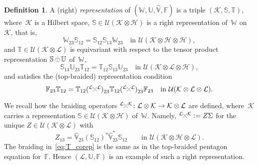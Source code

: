 \documentclass[a4paper]{amsart}
\numberwithin{equation}{section}
\theoremstyle{plain}
\numberwithin{theorem}{section}
\theoremstyle{definition}
\newtheorem{definition}[theorem]{Definition}
\theoremstyle{remark}
\newcommand{\tenscorep}{\mathbin{\begin{tikzpicture}[baseline,x=.75ex,y=.75ex] \draw[line width=.2pt] (-0.8,1.15)--(0.8,1.15);\draw[line width=.2pt](0,-0.25)--(0,1.15); \draw[line width=.2pt] (0,0.75) circle [radius = 1];\end{tikzpicture}}}
\newcommand*{\Braiding}[2]{\begin{tikzpicture}[baseline]
    \draw[-] (0,0) -- (1.4ex,1.4ex) node[right,inner sep=0pt] {$\scriptstyle #2$};
    \draw[-,draw=white,line width=2.4pt] (0,1.4ex) -- (1.4ex,0);
    \draw[-] (1.4ex,0) -- (0,1.4ex) node[left,inner sep=0pt] {$\scriptstyle #1$};
  \end{tikzpicture}}
\newcommand*{\Dualbraiding}[2]{\begin{tikzpicture}[baseline]
    \draw[-] (1.4ex,0) -- (0,1.4ex) node[left,inner sep=0pt] {$\scriptstyle #1$};
    \draw[-,draw=white,line width=2.4pt] (0,0) -- (1.4ex,1.4ex);
    \draw[-] (0,0) -- (1.4ex,1.4ex) node[right,inner sep=0pt] {$\scriptstyle #2$};
  \end{tikzpicture}}
\newcommand*{\Corep}[1]{\mathbb{#1}}          %
\newcommand*{\DuCorep}[1]{\hat{\Corep{#1}}}   %
\newcommand*{\Multunit}[1][]{\mathbb W^{#1}}%
\newcommand*{\BrMultunit}{\mathbb F}%
\newcommand*{\Flip}{\Sigma}%
\newcommand*{\Hils}[1][H]{\mathcal{#1}}%
\newcommand*{\U}{\mathcal U}%
\newcommand*{\defeq}{\mathrel{\vcentcolon=}}
\begin{document}
\begin{definition}
  \label{def:braided_corep}
  A (right) \emph{representation} of
  \((\Multunit,\Corep{U},\DuCorep{V},\BrMultunit)\)
  is a triple \((\Hils[K],\Corep{S},\Corep{T})\),
  where~\(\Hils[K]\)
  is a Hilbert space, \(\Corep{S}\in \U(\Hils[K]\otimes\Hils)\)
  is a right representation of~\(\Multunit\)
  on~\(\Hils[K]\), that is,
  \begin{equation}
    \label{eq:S_corep}
    \Multunit_{23} \Corep{S}_{12}
    = \Corep{S}_{12} \Corep{S}_{13} \Multunit_{23}
    \quad\text{in }\U(\Hils[K]\otimes\Hils\otimes\Hils),
  \end{equation}
  and \(\Corep{T}\in\U(\Hils[K]\otimes\Hils[L])\)
  is equivariant with respect to the tensor product representation
  \(\Corep{S}\tenscorep\Corep{U}\) of~\(\Multunit\),
  \begin{equation}
    \label{eq:T_SU-invariant}
    \Corep{S}_{13} \Corep{U}_{23} \Corep{T}_{12}
    = \Corep{T}_{12} \Corep{S}_{13} \Corep{U}_{23}
    \quad\text{in }\U(\Hils[K]\otimes\Hils[L]\otimes \Hils),
  \end{equation}
  and satisfies the (top-braided) representation condition
  \begin{equation}
    \label{eq:T_corep}
    \BrMultunit_{23} \Corep{T}_{12}
    = \Corep{T}_{12} (\Braiding{\Hils[L]}{\Hils[L]})^{\phantom1}_{23}
    \Corep{T}_{12} (\Dualbraiding{\Hils[L]}{\Hils[L]})^{\phantom1}_{23}
    \BrMultunit_{23}
    \quad\text{in }\U(\Hils[K]\otimes\Hils[L]\otimes\Hils[L]).
  \end{equation}
\end{definition}

We recall how the braiding operators
\(\Braiding{\Hils[L]}{\Hils[K]}\colon \Hils[L]\otimes\Hils[K]
\to\Hils[K]\otimes\Hils[L]\)
are defined, where~\(\Hils[K]\)
carries a representation \(\Corep{S}\in \U(\Hils[K]\otimes\Hils)\)
of~\(\Multunit\).
Namely, \(\Braiding{\Hils[L]}{\Hils[K]} \defeq Z\Flip\)
for the unique \(Z\in\U(\Hils[K]\otimes\Hils[L])\) with
\begin{equation}
  \label{eq:braid-Z-def}
  Z_{13} = \DuCorep{V}_{23} (\Corep{S}_{12})^* \DuCorep{V}_{23}^*
  \Corep{S}_{12}
  \qquad \text{in }\U(\Hils[K]\otimes \Hils\otimes \Hils[L]).
\end{equation}
The braiding in~\eqref{eq:T_corep} is the same as in the top-braided
pentagon equation for~\(\BrMultunit\).
Hence \((\Hils[L],\Corep{U},\BrMultunit)\)
is an example of such a right representation.
\end{document}
